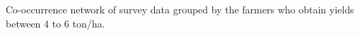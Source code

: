 Co-occurrence network of survey data grouped by the farmers who obtain yields between 4 to 6 ton/ha.